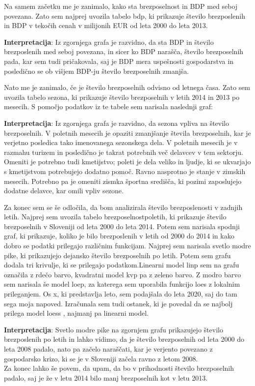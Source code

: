 \documentclass[11pt,a4paper]{article}
\begin{document}
Na samem začetku me je zanimalo, kako sta brezposelnost in BDP med seboj povezana. Zato sem najprej uvozila tabelo bdp, ki prikazuje število brezposlenih in BDP v tekočih cenah v milijonih EUR od leta 2000 do leta 2013.


\textbf{Interpretacija}: Iz zgornjega grafa je razvidno, da sta BDP in število brezposlenih med seboj povezana, in sicer ko BDP narašča, število brezposelnih pada, kar sem tudi pričakovala, saj je BDP mera uspešnosti gospodarstva in posledično se ob višjem BDP-ju število brezposelnih zmanjša.

\newpage
Nato me je zanimalo, če je število brezposelnih odvisno od letnega časa. Zato sem uvozila tabelo sezona, ki prikazuje število brezposelnih v letih 2014 in 2013 po mesecih. S pomočjo podatkov iz te tabele sem narisala naslednji graf:


\textbf{Interpretacija}: Iz zgornjega grafa je razvidno, da sezona vpliva na število brezposelnih. V poletnih mesecih je opaziti zmanjšanje števila brezposelnih, kar je verjetno posledica tako imenovanega sezonskega dela. V poletnih mesecih je v razmahu turizem in posledično je takrat potrebnih več delavcev v tem sektorju. Omeniti je potrebno tudi kmetijstvo; poleti je dela veliko in ljudje, ki se ukvarjajo s kmetijstvom potrebujejo dodatno pomoč. Ravno nasprotno je stanje v zimskih mesecih. Potrebno pa je omeniti zismka športna središča, ki pozimi zaposlujejo dodatne delavce, kar omili vpliv sezone.

\newpage
Za konec sem se še odločila, da bom analizirala število brezposlenosti v zadnjih letih. Najprej sem uvozila tabelo brezposelnostpoletih, ki prikazuje število brezposelnih v Sloveniji od leta 2000 do leta 2014. Potem sem narisala spodnji graf, ki prikazuje, koliko je bilo brezposlenih v letih od 2000 do 2014 in kako dobro se podatki prilegajo različnim funkcijam. Najprej sem narisala svetlo modre pike, ki prikazujejo dejansko število brezposelnih po letih. Potem sem grafu dodala tri krivulje, ki se prilegajo podatkom.Linearni model linp sem na grafu označila z rdečo barvo, kvadratni model kvp pa z zeleno barvo. Z modro barvo sem narisala še model loep, za katerega sem uporabila funkcijo loes z lokalnim prileganjem. Os x, ki predstavlja leto, sem podajšala do leta 2020, saj do tam sega moja napoved. Izračunala sem tudi ostanek, ki je povedal da se najbolj prilega model loess , najmanj pa linearni model.


\textbf{Interpretacija}: Svetlo modre pike na zgornjem grafu prikazujejo število brezposlenih po letih in lahko vidimo, da je število brezposelnih od leta 2000 do leta 2008 padalo, nato pa začelo naraščati, kar je verjento povezano z gospodarsko krizo, ki se je v Sloveniji začela ravno z letom 2008.\\

Za konec lahko še povem, da upam, da bo v prihodnosti število brezposelnih padalo, saj je že v letu 2014 bilo manj brezposelnih kot v letu 2013.
\end{document}
